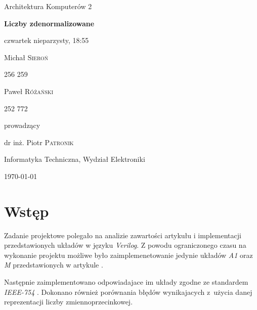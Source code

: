 \documentclass{article}
\begin{document}
\begin{titlepage}
	\clearpage
	\thispagestyle{empty}
    \centering
    
	{\LARGE Architektura Komputerów 2 \par}
	
	\vspace{1.5cm}
	
	{\huge\bfseries Liczby zdenormalizowane\par}
	
	\vspace{1.5cm}
	{\large czwartek nieparzysty, 18:55\par}

	\vspace{1cm}
    \parbox{0.4\linewidth}{
	    \centering
	    {\Large Michał \textsc{Sieroń}\par}
	    {\large 256 259\par}
	}
    \hfill
    \parbox{0.4\linewidth}{
	    \centering
	    {\Large Paweł \textsc{Różański}\par}
	    {\large 252 772\par}
	}

	\vspace{1.5cm}
	{\large prowadzący\par}
	{\large dr inż. Piotr \textsc{Patronik}\par}
    
	\vfill

	{\large Informatyka Techniczna, Wydział Elektroniki\par}
	\vspace{0.5cm}
	{\large \today\par}
	\clearpage
\end{titlepage}

\tableofcontents
\newpage

\section{Wstęp}
Zadanie projektowe polegało na analizie zawartości artykułu i implementacji przedstawionych układów w języku \emph{Verilog}.
Z powodu ograniczonego czasu na wykonanie projektu możliwe było zaimplemenetowanie jedynie układów \emph{A1} oraz \emph{M} przedstawionych w artykule \cite{art:old}.

Następnie zaimplementowano odpowiadajace im układy zgodne ze standardem \emph{IEEE-754} \cite{art:ieee754} \cite{pdf:ieee754}.
Dokonano również porównania błędów wynikajacych z~użycia danej reprezentacji liczby zmiennoprzecinkowej. 
\end{document}
